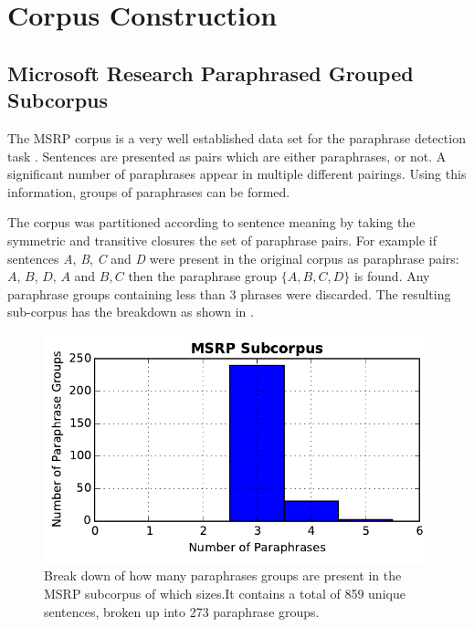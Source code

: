 \documentclass[]{book}
\begin{document}
\section{Corpus Construction}

\label{sec:Corpus-Construction}


\subsection{Microsoft Research Paraphrased Grouped Subcorpus}

The MSRP corpus is a very well established data set for the paraphrase
detection task \cite{msrParapharaCorpus}. Sentences are presented
as pairs which are either paraphrases, or not. A significant number
of paraphrases appear in multiple different pairings. Using this information,
groups of paraphrases can be formed.

The corpus was partitioned according to sentence meaning by taking
the symmetric and transitive closures the set of paraphrase pairs.
For example if sentences \emph{A},\emph{ B},\emph{ C} and \emph{D}
were present in the original corpus as paraphrase pairs: $A,\,B$,
$D,\,A$ and $B,C$ then the paraphrase group $\{A,B,C,D\}$ is found.
Any paraphrase groups containing less than 3 phrases were discarded.
The resulting sub-corpus has the breakdown as shown in .

\begin{figure}[t]
\includegraphics[width=1\columnwidth]{figs/msrp_hist}

\caption{\label{fig:msrp_corpus_hist} Break down of how many paraphrases groups
are present in the MSRP subcorpus of which sizes.It contains a total
of 859 unique sentences, broken up into 273 paraphrase groups.}
\end{figure}
\end{document}
